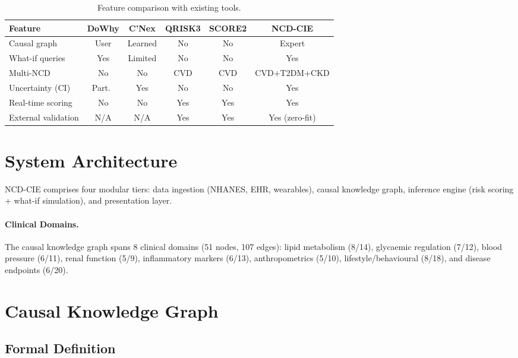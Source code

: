 \documentclass[runningheads]{llncs}
\begin{document}
\renewcommand{\arraystretch}{1.1}
\begin{table}[t]
\centering
\caption{Feature comparison with existing tools.}\label{tab:toolcomp}
\small
\begin{tabular}{@{}lccccc@{}}
\toprule
\textbf{Feature} & \textbf{DoWhy} & \textbf{C'Nex} &
\textbf{QRISK3} & \textbf{SCORE2} & \textbf{NCD-CIE} \\
\midrule
Causal graph        & User & Learned & No  & No  & Expert \\
What-if queries     & Yes & Limited & No  & No  & Yes \\
Multi-NCD           & No  & No      & CVD & CVD & CVD+T2DM+CKD \\
Uncertainty (CI)    & Part.\ & Yes & No  & No  & Yes \\
Real-time scoring   & No  & No      & Yes & Yes & Yes \\
External validation & N/A & N/A     & Yes & Yes & Yes (zero-fit) \\
\bottomrule
\end{tabular}
\end{table}
\renewcommand{\arraystretch}{1.0}

\section{System Architecture}\label{sec:arch}

NCD-CIE comprises four modular tiers: data ingestion (NHANES, EHR,
wearables), causal knowledge graph, inference engine (risk scoring +
what-if simulation), and presentation layer.

\paragraph{Clinical Domains.}
The causal knowledge graph spans 8 clinical domains (51 nodes,
107 edges): lipid metabolism (8/14), glycaemic regulation (7/12),
blood pressure (6/11), renal function (5/9), inflammatory markers
(6/13), anthropometrics (5/10), lifestyle/behavioural (8/18), and
disease endpoints (6/20).

\section{Causal Knowledge Graph}\label{sec:kg}

\subsection{Formal Definition}\label{sec:formal}
\end{document}
